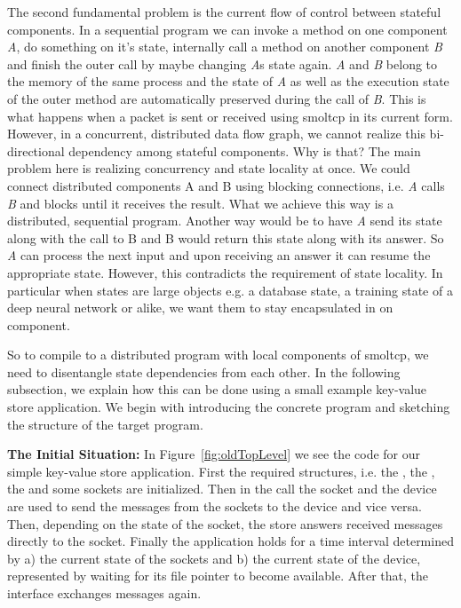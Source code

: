 The second fundamental problem is the current flow of control between stateful components. In a sequential program we can invoke a method on one component \emph{A}, do something on it's state, internally call a method on another component \emph{B} and finish the outer call by maybe changing \emph{A}s state again. \emph{A} and \emph{B} belong to the memory of the same process and the state of \emph{A} as well as the execution state of the outer method are automatically preserved during the call of \emph{B}.
This is what happens when a packet is sent or received using smoltcp in its current form. However, in a concurrent, distributed data flow graph, we cannot realize this bi-directional dependency among stateful components. Why is that? The main problem here is realizing concurrency and state locality at once. We could connect distributed components A and B using blocking connections, i.e. \emph{A} calls \emph{B} and blocks until it receives the result. What we achieve this way is a distributed, sequential program. Another way would be to have \emph{A} send its state along with the call to B and B would return this state along with its answer. So \emph{A} can process the next input and upon receiving an answer it can resume the appropriate state. However, this contradicts the requirement of state locality. In particular when states are large objects e.g. a database state, a training state of a deep neural network or alike, we want them to stay encapsulated in on component.\\

So to compile to a distributed program with local components of smoltcp, we need to disentangle state dependencies from each other. In the following subsection, we explain how this can be done using a small example key-value store application. We begin with introducing the concrete program and sketching the structure of the target program.

\textbf{The Initial Situation: } In Figure~\ref{fig:oldTopLevel} we see the code for our simple key-value store application. First the required structures, i.e. the , the , the  and some sockets are initialized. Then in the  call the socket and the device are used to send the messages from the sockets to the device and vice versa. Then, depending on the state of the socket, the store answers received messages directly to the socket. Finally the application holds for a time interval determined by a) the current state of the sockets  and b) the current state of the device, represented by waiting for its file pointer  to become available. After that, the interface exchanges messages again.


